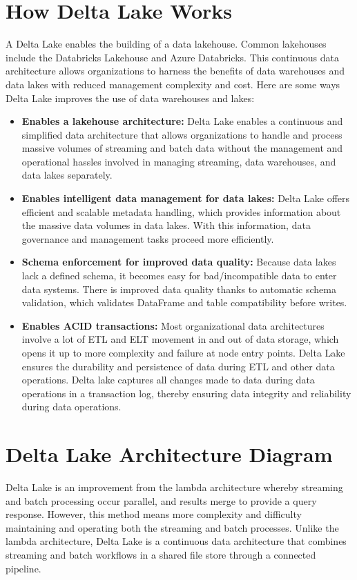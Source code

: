 \section{How Delta Lake Works}
A Delta Lake enables the building of a data lakehouse. Common lakehouses include the Databricks Lakehouse and Azure Databricks. This continuous data architecture allows organizations to harness the benefits of data warehouses and data lakes with reduced management complexity and cost. Here are some ways Delta Lake improves the use of data warehouses and lakes:
\begin{itemize}
    \item \textbf{Enables a lakehouse architecture:} Delta Lake enables a continuous and simplified data architecture that allows organizations to handle and process massive volumes of streaming and batch data without the management and operational hassles involved in managing streaming, data warehouses, and data lakes separately.
    \item \textbf{Enables intelligent data management for data lakes:} Delta Lake offers efficient and scalable metadata handling, which provides information about the massive data volumes in data lakes. With this information, data governance and management tasks proceed more efficiently.
    \item \textbf{Schema enforcement for improved data quality:} Because data lakes lack a defined schema, it becomes easy for bad/incompatible data to enter data systems. There is improved data quality thanks to automatic schema validation, which validates DataFrame and table compatibility before writes.
    \item \textbf{Enables ACID transactions:} Most organizational data architectures involve a lot of ETL and ELT movement in and out of data storage, which opens it up to more complexity and failure at node entry points. Delta Lake ensures the durability and persistence of data during ETL and other data operations. Delta lake captures all changes made to data during data operations in a transaction log, thereby ensuring data integrity and reliability during data operations.
\end{itemize}

\section{Delta Lake Architecture Diagram}
\begin{flushleft}
Delta Lake is an improvement from the lambda architecture whereby streaming and batch processing occur parallel, and results merge to provide a query response. However, this method means more complexity and difficulty maintaining and operating both the streaming and batch processes. Unlike the lambda architecture, Delta Lake is a continuous data architecture that combines streaming and batch workflows in a shared file store through a connected pipeline.
\end{flushleft}

